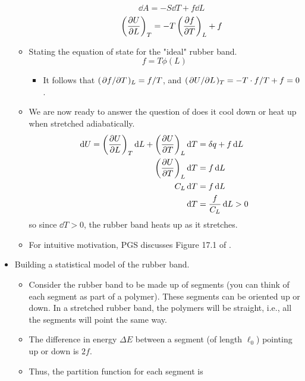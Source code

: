 \documentclass[../notes.tex]{subfiles}
\begin{document}
\begin{itemize}
\begin{itemize}
\begin{itemize}
\begin{equation*}
                \dd{A} = -S\dd{T}+f\dd{L}
            \end{equation*}
            \begin{equation*}
                \left( \pdv{U}{L} \right)_T = -T\left( \pdv{f}{T} \right)_L+f
            \end{equation*}
        \end{itemize}
        \item Stating the equation of state for the "ideal" rubber band.
        \begin{equation*}
            f = T\phi(L)
        \end{equation*}
        \begin{itemize}
            \item It follows that $(\pdv*{f}{T})_L=f/T$, and $(\pdv*{U}{L})_T=-T\cdot f/T+f=0$.
        \end{itemize}
        \item We are now ready to answer the question of does it cool down or heat up when stretched adiabatically.
        \begin{align*}
            \dd{U} = \left( \pdv{U}{L} \right)_T\dd{L}+\left( \pdv{U}{T} \right)_L\dd{T} &= \var{q}+f\dd{L}\\
            \left( \pdv{U}{T} \right)_L\dd{T} &= f\dd{L}\\
            C_L\dd{T} &= f\dd{L}\\
            \dd{T} &= \frac{f}{C_L}\dd{L} > 0
        \end{align*}
        so since $\dd{T}>0$, the rubber band heats up as it stretches.
        \item For intuitive motivation, PGS discusses Figure 17.1 of \textcite{bib:APChemNotes}.
    \end{itemize}
    \item Building a statistical model of the rubber band.
    \begin{itemize}
        \item Consider the rubber band to be made up of segments (you can think of each segment as part of a polymer). These segments can be oriented up or down. In a stretched rubber band, the polymers will be straight, i.e., all the segments will point the same way.
        \item The difference in energy $\Delta E$ between a segment (of length $\ell_0$) pointing up or down is $2f$.
        \item Thus, the partition function for each segment is
        \begin{equation*}

\end{equation*}
\end{itemize}
\end{itemize}
\end{document}
